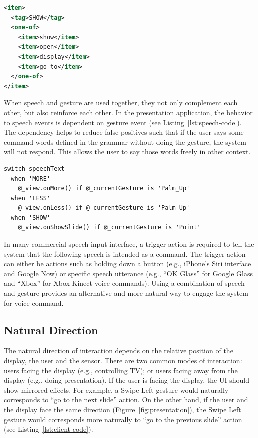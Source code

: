 \begin{lstlisting}[caption={An example of grammar definition in XML.},
language=XML, label={lst:grammar}] 
<item>
  <tag>SHOW</tag>
  <one-of>
    <item>show</item>
    <item>open</item>
    <item>display</item>
    <item>go to</item>
  </one-of>
</item>
\end{lstlisting}

When speech and gesture are used together, they not only complement each
other, but also reinforce each other. In the 
presentation application, the behavior to speech events is dependent on gesture
event (see Listing~\ref{lst:speech-code}). The dependency helps to reduce false
positives such that if the user says some command words defined in the grammar 
without doing the gesture, the system will not respond. This allows the user to
say those words freely in other context.

\begin{lstlisting}[caption={Code for speech events in CoffeeScript.},
label={lst:speech-code}] switch speechText
  when 'MORE'
    @_view.onMore() if @_currentGesture is 'Palm_Up'
  when 'LESS'
    @_view.onLess() if @_currentGesture is 'Palm_Up'
  when 'SHOW'
    @_view.onShowSlide() if @_currentGesture is 'Point'
\end{lstlisting}

In many commercial speech input interface, a trigger action is required to tell
the system that the following speech is intended as a command. The trigger
action can either be actions such as holding down a button (e.g., iPhone's
Siri interface and Google Now) or specific speech utterance (e.g., ``OK Glass''
for Google Glass and ``Xbox'' for Xbox Kinect voice commands). Using a
combination of speech and gesture provides an alternative and more natural way
to engage the system for voice command.

\subsection{Natural Direction}
The natural direction of interaction depends on the relative position of the
display, the user and the sensor. There are two common modes of interaction:
users facing the display (e.g., controlling TV); or users facing away from the
display (e.g., doing presentation). If the user is facing the display, the UI should show mirrored
effects.
For example, a Swipe Left gesture would naturally corresponds to ``go to the next slide'' action. On the other hand, if
the user and the display face the same direction
(Figure~\ref{fig:presentation}), the Swipe Left gesture would corresponds more
naturally to ``go to the previous slide'' action (see
Listing~\ref{lst:client-code}).

